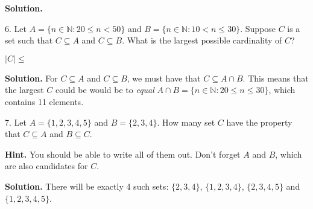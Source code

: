 \documentclass[10pt,]{book}
\theoremstyle{plain}
\theoremstyle{definition}
\theoremstyle{definition}
\numberwithin{equation}{chapter}
\newcommand{\N}{\mathbb N}
\newcommand{\st}{:}
\newcommand{\card}[1]{\left| #1 \right|}
\newcommand{\lt}{<}
\begin{document}
\begin{exerciselist}
\par
\medskip\noindent%
\textbf{Solution.}\quad \hypertarget{p-485}{}%
%
\par
\item[6.]\hypertarget{exercise-26}{}\noindent%
\hypertarget{p-486}{}%
Let \(A = \{n \in \N \st 20 \le n \lt 50\}\) and \(B = \{n \in \N \st 10 \lt n \le 30\}\). Suppose \(C\) is a set such that \(C \subseteq A\) and \(C \subseteq B\).  What is the largest possible cardinality of \(C\)?%
\par
\hypertarget{p-487}{}%
\(\card{C} \le \) \framebox[6em]{\raisebox{1ex}{}}%
\par
\medskip\noindent%
\textbf{Solution.}\quad \hypertarget{p-488}{}%
For \(C \subseteq A\) and \(C \subseteq B\), we must have that \(C \subseteq A \cap B\).  This means that the largest \(C\) could be would be to \emph{equal} \(A \cap B = \{n \in \N \st 20 \le n \le 30\}\), which contains 11 elements.%
\par
\item[7.]\hypertarget{exercise-27}{}\noindent%
\hypertarget{p-489}{}%
Let \(A = \{1,2,3,4,5\}\) and \(B = \{2, 3, 4\}\).  How many set \(C\) have the property that \(C \subseteq A\) and \(B \subseteq C\).%
\par
\hypertarget{p-490}{}%
 \framebox[5em]{\raisebox{1ex}{}}%
\par
\medskip\noindent%
\textbf{Hint.}\quad \hypertarget{p-491}{}%
You should be able to write all of them out.  Don't forget \(A\) and \(B\), which are also candidates for \(C\).%
\par
\medskip\noindent%
\textbf{Solution.}\quad \hypertarget{p-492}{}%
There will be exactly 4 such sets: \(\{2, 3, 4\}\), \(\{1,2,3,4\}\), \(\{2,3,4,5\}\) and \(\{1,2,3,4,5\}\).%
\par
\end{exerciselist}
\typeout{************************************************}
\typeout{************************************************}
\end{document}

